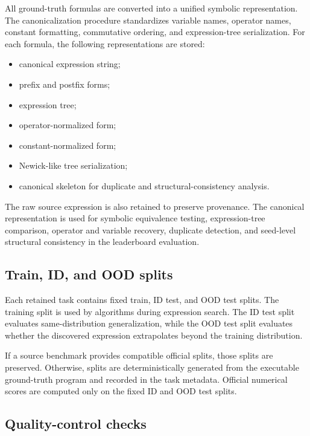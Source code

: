 All ground-truth formulas are converted into a unified symbolic representation. The canonicalization procedure standardizes variable names, operator names, constant formatting, commutative ordering, and expression-tree serialization. For each formula, the following representations are stored:
\begin{itemize}
    \item canonical expression string;
    \item prefix and postfix forms;
    \item expression tree;
    \item operator-normalized form;
    \item constant-normalized form;
    \item Newick-like tree serialization;
    \item canonical skeleton for duplicate and structural-consistency analysis.
\end{itemize}

The raw source expression is also retained to preserve provenance. The canonical representation is used for symbolic equivalence testing, expression-tree comparison, operator and variable recovery, duplicate detection, and seed-level structural consistency in the leaderboard evaluation.

\subsection{Train, ID, and OOD splits}

Each retained task contains fixed train, ID test, and OOD test splits. The training split is used by algorithms during expression search. The ID test split evaluates same-distribution generalization, while the OOD test split evaluates whether the discovered expression extrapolates beyond the training distribution.

If a source benchmark provides compatible official splits, those splits are preserved. Otherwise, splits are deterministically generated from the executable ground-truth program and recorded in the task metadata. Official numerical scores are computed only on the fixed ID and OOD test splits.

\subsection{Quality-control checks}

